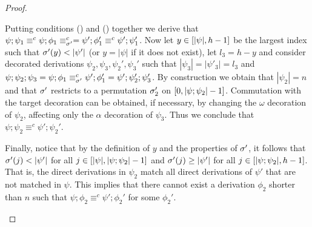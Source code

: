 \begin{proof}
\begin{enumerate}
  Putting conditions (\dag) and (\ddag) together we derive that
  $\psi;\psi_1 \equiv^c \psi;\phi_1\equiv^c_{\perm'} = \psi';\phi'_1
  \equiv^c \psi';\psi'_1$.  Now let $y \in\interval[|\psi|]{h-1}$ be
  the largest index such that $\perm'(y) < |\psi'|$ (or $y= |\psi|$ if
  it does not exist), let $l_3 = h - y$ and consider decorated
  derivations $\psi_2, \psi_3, \psi_2',\psi_3'$ such that
  $|\psi_3| = |\psi'_3| = l_3$ and
  $ \psi;\psi_2;\psi_3 = \psi;\phi_1 \equiv^c_{\perm'} \psi';\phi'_1 =
  \psi';\psi'_2;\psi'_3$.  By construction we obtain that
  $|\psi_2| = n$ and that $\perm'$ restricts to a permutation
  $\perm'_2$ on $\interval[0]{|\psi;\psi_2|-1}$. Commutation with the
  target decoration can be obtained, if necessary, by changing the
  $\omega$ decoration of $\psi_2$, affecting only the $\alpha$
  decoration of $\psi_3$. Thus
  we conclude that
  $\psi;\psi_2 \equiv^c \psi';\psi_2'$.
  
  Finally, notice that by the definition of $y$ and the properties of $\perm'$, 
  it follows that $\perm'(j) < |\psi'|$ for all $j \in
  \interval[|\psi|]{|\psi;\psi_2|-1}$ and $\perm'(j) \geq |\psi'|$ for all $j \in \interval[|\psi;\psi_2|]{h-1}$. 
  That is, the direct derivations in $\psi_2$ match 
  all direct derivations of $\psi'$ that are not matched in $\psi$. This implies that 
  there cannot exist a derivation $\phi_2$ shorter than $n$ such that 
  $\psi;\phi_2 \equiv^c \psi';\phi_2'$ for some $\phi_2'$.
  
  
  

\end{enumerate}
\end{proof}
